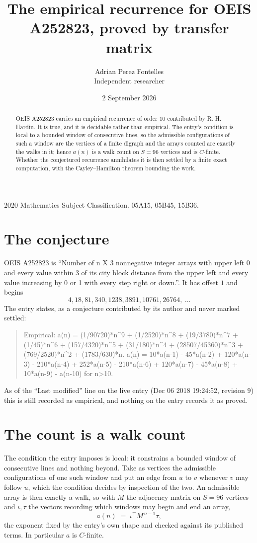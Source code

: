 \documentclass[11pt,a4paper]{article}
\title{The empirical recurrence for OEIS A252823, proved by transfer matrix}
\author{Adrian Perez Fontelles\\ \small Independent researcher}
\date{2 September 2026}
\theoremstyle{plain}
\theoremstyle{definition}
\begin{document}
\maketitle

\begin{abstract}
OEIS A252823 carries an empirical recurrence of order $10$ contributed by R. H. Hardin. It is
true, and it is decidable rather than empirical. The entry's condition is local to a bounded window of consecutive lines, so
the admissible configurations of such a window are the vertices of a finite digraph and the
arrays counted are exactly the walks in it; hence $a(n)$ is a walk count on $S=96$ vertices
and is $C$-finite. Whether the conjectured recurrence annihilates it is then settled by a
finite exact computation, with the Cayley--Hamilton theorem bounding the work.
\end{abstract}

\noindent\small 2020 Mathematics Subject Classification. 05A15, 05B45, 15B36.\normalsize

\section{The conjecture}

OEIS A252823 is ``Number of n X 3 nonnegative integer arrays with upper left 0 and every value within 3 of its city block distance from the upper left and every value increasing by 0 or 1 with every step right or down.''. It has offset $1$ and begins
\[
4, 18, 81, 340, 1238, 3891, 10761, 26764,\ \dots
\]
The entry states, as a conjecture contributed by its author and never marked settled:
\begin{quote}
Empirical: a(n) = (1/90720)*n\^{}9 + (1/2520)*n\^{}8 + (19/3780)*n\^{}7 + (1/45)*n\^{}6 + (157/4320)*n\^{}5 + (31/180)*n\^{}4 + (28507/45360)*n\^{}3 + (769/2520)*n\^{}2 + (1783/630)*n. a(n) = 10*a(n-1) - 45*a(n-2) + 120*a(n-3) - 210*a(n-4) + 252*a(n-5) - 210*a(n-6) + 120*a(n-7) - 45*a(n-8) + 10*a(n-9) - a(n-10) for n>10.
\end{quote}
As of the ``Last modified'' line on the live entry (Dec 06 2018 19:24:52, revision 9) this is still
recorded as empirical, and nothing on the entry records it as proved.

\section{The count is a walk count}

The condition the entry imposes is local: it constrains a bounded window of consecutive lines and nothing beyond. Take as
vertices the admissible configurations of one such window and put an edge from $u$ to $v$
whenever $v$ may follow $u$, which the condition decides by inspection of the two. An
admissible array is then exactly a walk, so with $M$ the adjacency matrix on $S=96$ vertices
and $\iota,\tau$ the vectors recording which windows may begin and end an array,
\[
a(n)\;=\;\iota^{\!\top}M^{\,n-1}\tau ,
\]
the exponent fixed by the entry's own shape and checked against its published terms. In
particular $a$ is $C$-finite.
\end{document}
